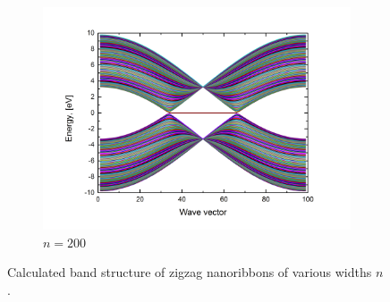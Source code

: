 \begin{figure}[hb!]
\begin{subfigure}{.5\textwidth}
  \includegraphics[width=\linewidth]{img/zz_ribbon_200}
  \caption{$n=200$}
  \label{fig:zz200}
\end{subfigure}
\caption{Calculated band structure of zigzag nanoribbons of various widths $n$.\label{fig:zz_ribbons}}
\end{figure}
